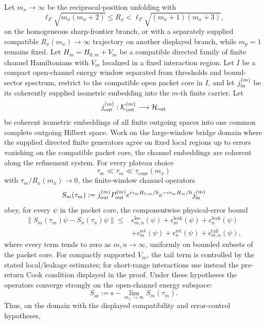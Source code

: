 \documentclass[12pt,a4paper]{article}
\begin{document}
\begin{theorem}
\label{p4:thm:moller-bridge}
Let \(m_x\to\infty\) be the reciprocal-position unfolding with
\[
\ell_F\sqrt{m_x(m_x+2)}
\le R_x
<\ell_F\sqrt{(m_x+1)(m_x+3)},
\]
on the homogeneous sharp-frontier branch, or with a separately supplied
compatible \(R_x(m_x)\to\infty\) trajectory on another displayed branch,
while \(m_p=1\) remains fixed.
Let \(H_m=H_{0,m}+V_m\) be a compatible directed family of finite channel Hamiltonians with \(V_m\) localized in a fixed interaction region.
Let \(I\) be a compact open-channel energy window separated from thresholds
and bound-sector spectrum, restrict to the compatible open packet core in
\(I\), and let
\(j_{\rm in}^{(m)}\) be its coherently supplied isometric embedding into the
\(m\)-th finite carrier.  Let
\[
j_{\rm out}^{(m)}:
\mathcal K^{(m)}_{\rm out}\longrightarrow\mathcal H_{\rm out}
\]
be coherent isometric embeddings of all finite outgoing spaces into one
common complete outgoing Hilbert space.  Work on the large-window bridge
domain where the
supplied directed finite generators agree on fixed local regions up to errors
vanishing on the compatible packet core, the channel embeddings are coherent
along the refinement system.
For every plateau choice
\[
\tau_{\mathrm{sc}}\ll \tau_m\ll \tau_{\mathrm{cone}}(m_x)
\]
with \(\tau_m/R_x(m_x)\to0\), the finite-window channel operators
\[
S_m(\tau_m)
:=
j_{\rm out}^{(m)}
P^{(m)}_{\mathrm{out}}
e^{i\tau_mH_{0,m}/\hbar}
e^{-i\tau_mH_m/\hbar}
j^{(m)}_{\mathrm{in}}
\]
obey, for every \(\psi\) in the packet core, the componentwise physical-error
bound
\[
\begin{aligned}
\|S_m(\tau_m)\psi-S_n(\tau_n)\psi\|
\le{}&
\epsilon^{\mathrm{loc}}_{m,n}(\psi)
+\epsilon^{\mathrm{leak}}_m(\psi)
+\epsilon^{\mathrm{leak}}_n(\psi)\\
&+\epsilon^{\mathrm{ret}}_m(\psi)
+\epsilon^{\mathrm{ret}}_n(\psi)
+\epsilon^{\mathrm{tail}}_{m,n}(\psi),
\end{aligned}
\]
where every term tends to zero as \(m,n\to\infty\), uniformly on bounded
subsets of the packet core.  For compactly supported \(V_m\), the tail term
is controlled by the stated local/leakage estimates; for short-range
interactions use instead the pre-return Cook condition displayed in the
proof.  Under these hypotheses the operators
converge strongly on the open-channel energy subspace:
\[
S_{\mathrm{as}}
:=
\mathrm{s}\!-\!\lim_{m_x\to\infty}S_m(\tau_m).
\]
Thus, on the domain with the displayed compatibility and error-control hypotheses,

\end{theorem}
\end{document}
